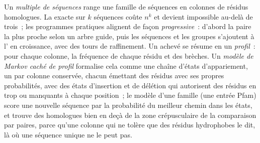 \begin{definition}\label{def:b3:bioinformatics:msa}
Un \emph{ multiple de séquences} range une famille de
séquences en colonnes de résidus homologues. La 
exacte sur $k$ séquences coûte $n^{k}$ et devient impossible au-delà de
trois~; les programmes pratiques alignent de façon
\emph{progressive}~: d'abord la paire la plus proche selon un arbre
guide, puis les séquences et les groupes s'ajoutent à l' en
croissance, avec des tours de raffinement. Un  achevé se
résume en un \emph{profil}~: pour chaque colonne, la fréquence de
chaque résidu et des brèches. Un \emph{modèle de Markov caché de
profil} formalise cela comme une chaîne d'états d'appariement, un par
colonne conservée, chacun émettant des résidus avec ses propres
probabilités, avec des états d'insertion et de délétion qui autorisent
des résidus en trop ou manquants à chaque position~; le modèle d'une
famille (une entrée Pfam) score une nouvelle séquence par la
probabilité du meilleur chemin dans les états, et trouve des homologues
bien en deçà de la zone crépusculaire de la comparaison par paires,
parce qu'une colonne qui ne tolère que des résidus hydrophobes le dit,
là où une séquence unique ne le peut pas.
\end{definition}

